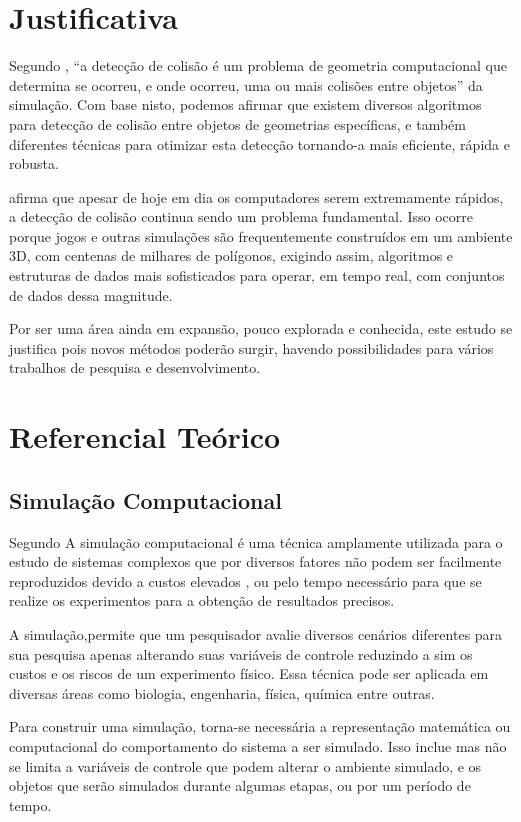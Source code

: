 \section{Justificativa}

Segundo , “a detecção de colisão é um problema de geometria computacional que determina se ocorreu, e onde ocorreu, uma ou mais colisões entre objetos” da simulação. Com base nisto, podemos afirmar que existem diversos algoritmos para detecção de colisão entre objetos de geometrias específicas, e também diferentes técnicas para otimizar esta detecção tornando-a mais eficiente, rápida e robusta.

 afirma que apesar de hoje em dia os computadores serem extremamente rápidos, a detecção de colisão continua sendo um problema fundamental. Isso ocorre porque jogos e outras simulações são frequentemente construídos em um ambiente 3D, com centenas de milhares de polígonos, exigindo assim, algoritmos e estruturas de dados mais sofisticados para operar, em tempo real, com conjuntos de dados dessa magnitude.

Por ser uma área ainda em expansão, pouco explorada e conhecida, este estudo se justifica pois novos métodos poderão surgir, havendo possibilidades para vários trabalhos de pesquisa e desenvolvimento.

\section{Referencial Teórico}


\subsection{Simulação Computacional}

Segundo  A simulação computacional é uma técnica amplamente utilizada para o estudo de
sistemas complexos que por diversos fatores não podem ser facilmente
reproduzidos devido a custos elevados , ou pelo tempo necessário para que se
realize os experimentos para a obtenção de resultados precisos.

A simulação,permite que um pesquisador avalie diversos cenários diferentes para sua
pesquisa apenas alterando suas variáveis de controle reduzindo a sim os custos
e os riscos de um experimento físico. Essa técnica pode ser aplicada em
diversas áreas como biologia, engenharia, física, química entre outras.

Para construir uma simulação, torna-se necessária a representação matemática ou
computacional do comportamento do sistema a ser simulado. Isso inclue mas não
se limita a variáveis de controle que podem alterar o ambiente simulado, e os
objetos que serão simulados durante algumas etapas, ou por um período de tempo.


